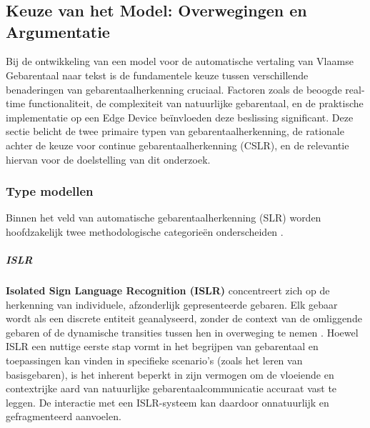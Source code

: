 \chapter{}%
\label{ch:stand-van-zaken}



\section{Keuze van het Model: Overwegingen en Argumentatie}
Bij de ontwikkeling van een model voor de automatische vertaling van Vlaamse Gebarentaal naar tekst is de fundamentele keuze tussen verschillende benaderingen van gebarentaalherkenning cruciaal. 
Factoren zoals de beoogde real-time functionaliteit, de complexiteit van natuurlijke gebarentaal, en de praktische implementatie op een Edge Device beïnvloeden deze beslissing significant. 
Deze sectie belicht de twee primaire typen van gebarentaalherkenning, de rationale achter de keuze voor continue gebarentaalherkenning (CSLR), en de relevantie hiervan voor de doelstelling van dit onderzoek.

\subsection{Type modellen}
Binnen het veld van automatische gebarentaalherkenning (SLR) worden hoofdzakelijk twee methodologische categorieën onderscheiden \citep{Sinha_et_al_2021}.

\paragraph{ISLR}
\textbf{Isolated Sign Language Recognition (ISLR)} concentreert zich op de herkenning van individuele, afzonderlijk gepresenteerde gebaren. 
Elk gebaar wordt als een discrete entiteit geanalyseerd, zonder de context van de omliggende gebaren of de dynamische transities tussen hen in overweging te nemen \citep{quantization_survey}. 
Hoewel ISLR een nuttige eerste stap vormt in het begrijpen van gebarentaal en toepassingen kan vinden in specifieke scenario's (zoals het leren van basisgebaren), is het inherent beperkt in zijn vermogen om de vloeiende en contextrijke aard van natuurlijke gebarentaalcommunicatie accuraat vast te leggen. 
De interactie met een ISLR-systeem kan daardoor onnatuurlijk en gefragmenteerd aanvoelen.

